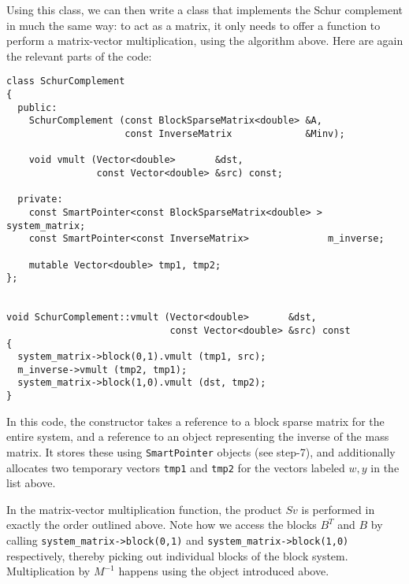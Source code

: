 \documentclass{article}
\begin{document}
Using this class, we can then write a class that implements the Schur
complement in much the same way: to act as a matrix, it only needs to offer a
function to perform a matrix-vector multiplication, using the algorithm
above. Here are again the relevant parts of the code:
\begin{verbatim}
class SchurComplement 
{
  public:
    SchurComplement (const BlockSparseMatrix<double> &A,
                     const InverseMatrix             &Minv);

    void vmult (Vector<double>       &dst,
                const Vector<double> &src) const;

  private:
    const SmartPointer<const BlockSparseMatrix<double> > system_matrix;
    const SmartPointer<const InverseMatrix>              m_inverse;
    
    mutable Vector<double> tmp1, tmp2;
};


void SchurComplement::vmult (Vector<double>       &dst,
                             const Vector<double> &src) const
{
  system_matrix->block(0,1).vmult (tmp1, src);
  m_inverse->vmult (tmp2, tmp1);
  system_matrix->block(1,0).vmult (dst, tmp2);
}
\end{verbatim}

In this code, the constructor takes a reference to a block sparse matrix for
the entire system, and a reference to an object representing the inverse of
the mass matrix. It stores these using \texttt{SmartPointer} objects (see
step-7), and additionally allocates two temporary vectors \texttt{tmp1} and
\texttt{tmp2} for the vectors labeled $w,y$ in the list above.

In the matrix-vector multiplication function, the product $Sv$ is performed in
exactly the order outlined above. Note how we access the blocks $B^T$ and $B$
by calling \texttt{system\_matrix->block(0,1)} and
\texttt{system\_matrix->block(1,0)} respectively, thereby picking out
individual blocks of the block system. Multiplication by $M^{-1}$ happens
using the object introduced above.
\end{document}
